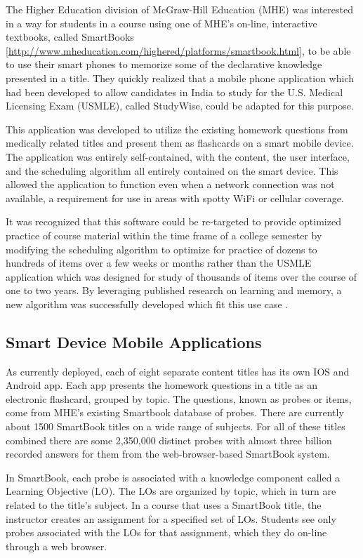 \documentclass[runningheads,a4paper]{llncs}
\begin{document}
The Higher Education division of McGraw-Hill Education  (MHE) was interested in a way for students in a course using one of MHE's on-line, interactive textbooks, called SmartBooks [\url{http://www.mheducation.com/highered/platforms/smartbook.html}], to be able to use their smart phones to memorize some of the declarative knowledge presented in a title.  They quickly realized that a mobile phone application which had been developed to allow candidates in India to study for the U.S. Medical Licensing Exam (USMLE), called StudyWise, could be adapted for this purpose. 

This application was developed to utilize the existing homework questions from medically related titles and present them as flashcards on a smart mobile device.  The application was entirely self-contained, with the content, the user interface, and the scheduling algorithm all entirely contained on the smart device.  This allowed the application to function even when a network connection was not available, a requirement for use in areas with spotty  WiFi or cellular coverage.

It was recognized that this software could be re-targeted to provide optimized practice of course material within the time frame of a college semester by modifying the scheduling algorithm to optimize for practice of dozens to hundreds of items over a few weeks or months rather than the USMLE application which was designed for study of thousands of items over the course of one to two years.   By leveraging published research on learning and memory, a new algorithm was successfully developed which fit this use case \cite{Riedesel2017}.

\subsection{ Smart Device Mobile Applications}

As currently deployed, each of eight separate content titles has its own IOS and Android app.  Each app presents the homework questions in a title as an electronic flashcard, grouped by topic.  The questions, known as probes or items, come from MHE's existing Smartbook database of probes.  There are currently about 1500 SmartBook titles on a wide range of subjects.  For all of these titles combined there are some 2,350,000 distinct probes with almost three billion recorded answers for them from the web-browser-based SmartBook system.  

In SmartBook, each probe is associated with a knowledge component called a Learning Objective (LO).  The LOs are organized by topic, which in turn are related to the title's subject.  In a course that uses a SmartBook title, the instructor creates an assignment for a specified set of LOs.  Students see only probes associated with the LOs for that assignment, which they do on-line through a web browser.
\end{document}

